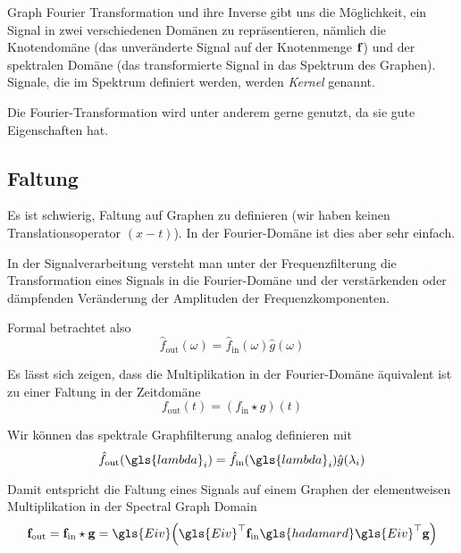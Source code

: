 Graph Fourier Transformation und ihre Inverse gibt uns die Möglichkeit, ein Signal in zwei verschiedenen Domänen zu repräsentieren, nämlich die Knotendomäne (das unveränderte Signal auf der Knotenmenge $\mathbf{f}$) und der spektralen Domäne (das transformierte Signal in das Spektrum des Graphen).
Signale, die im Spektrum definiert werden, werden \emph{Kernel} genannt.

Die Fourier-Transformation wird unter anderem gerne genutzt, da sie gute Eigenschaften hat.


\subsection{Faltung}

Es ist schwierig, Faltung auf Graphen zu definieren (wir haben keinen Translationsoperator $\left(x - t\right)$).
In der Fourier-Domäne ist dies aber sehr einfach.

In der Signalverarbeitung versteht man unter der Frequenzfilterung die Transformation eines Signals in die Fourier-Domäne und der verstärkenden oder dämpfenden Veränderung der Amplituden der Frequenzkomponenten.

Formal betrachtet also
\begin{equation}
  \hat f_{\mathrm{out}}\left(\omega\right) = \hat f_{\mathrm{in}}\left(\omega\right)\hat g\left(\omega\right)
\end{equation}

Es lässt sich zeigen, dass die Multiplikation in der Fourier-Domäne äquivalent ist zu einer Faltung in der Zeitdomäne 
\begin{equation}
  f_{\mathrm{out}}\left(t\right) = \left(f_{\mathrm{in}} \star g\right)\left(t\right)
\end{equation}

Wir können das spektrale Graphfilterung analog definieren mit
\begin{equation}
  \hat f_{\mathrm{out}}\left(\gls{lambda}_i\right) = \hat f_{\mathrm{in}}\left(\gls{lambda}_i\right)\hat g\left(\lambda_i\right)
\end{equation}

Damit entspricht die Faltung eines Signals auf einem Graphen der elementweisen Multiplikation in der Spectral Graph Domain
\begin{equation}
  \ve{f}_{\mathrm{out}} = \ve{f}_{\mathrm{in}} \star \ve{g} = \gls{Eiv}\left(\gls{Eiv}^{\top}\ve{f}_{\mathrm{in}} \gls{hadamard} \gls{Eiv}^{\top}\ve{g}\right)
\end{equation}


